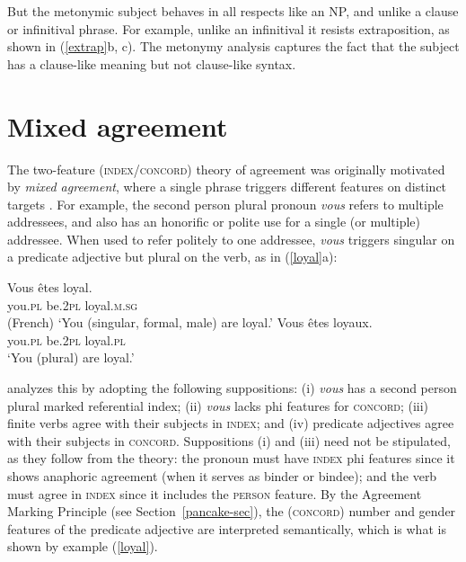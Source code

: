 \documentclass[output=paper,biblatex,babelshorthands,newtxmath,draftmode,colorlinks,citecolor=brown]{langscibook}
\begin{document}
\noindent
But the metonymic subject behaves in all respects like an NP, and unlike a clause or infinitival phrase.  For example, unlike an infinitival it resists extraposition, as shown in (\ref{extrap}b, c).  The metonymy analysis captures the fact that the subject has a clause-like meaning but not clause-like syntax.  
  


\section{Mixed agreement}
\label{mismatch}
 

The two-feature (\textsc{index/concord}) theory of agreement was originally motivated by
\textit{mixed agreement}, where a single phrase triggers different features on distinct targets
\parencites[Chapter~2]{Pollard+Sag:1994}{Kathol99b}.  For example, the  second person plural pronoun \textit{vous} refers to multiple addressees, and also has an honorific or polite use for a single (or multiple) addressee.  When used to refer politely to one addressee, \textit{vous} triggers singular on a predicate adjective but plural on the verb, as in (\ref{loyal}a):

\begin{exe} 
\ex\label{loyal}
\begin{xlist}
\ex
\gll   Vous		\^{e}tes		loyal. \\
		you.\textsc{pl}		be.\textsc{2pl}	loyal.\textsc{m.sg} \\\hfill(French)
\glt		`You (singular, formal, male) are loyal.’ 
\ex 
\gll	Vous		\^{e}tes		loyaux. \\
		you.\textsc{pl}		be.\textsc{2pl}	loyal.\textsc{pl} \\
\glt		`You (plural) are loyal.’  
\end{xlist}
\end{exe}

\noindent
\citet{Wechsler:2011} analyzes this by adopting the following suppositions: (i) \textit{vous} has a
second person plural marked referential index; (ii) \textit{vous} lacks phi features for
\textsc{concord}; (iii) finite verbs agree with their subjects in \textsc{index}; and (iv) predicate
adjectives agree with their subjects in \textsc{concord}.  Suppositions (i) and (iii) need not be
stipulated, as they follow from the theory:  the pronoun must have \textsc{index} phi features since
it shows anaphoric agreement (when it serves as binder or bindee); and the verb must agree in
\textsc{index} since it includes the \textsc{person} feature.  By the Agreement Marking
Principle (see Section~\ref{pancake-sec}), the (\textsc{concord}) number and gender features of the predicate adjective are interpreted semantically, which is what is shown by example (\ref{loyal}). 
\end{document}
